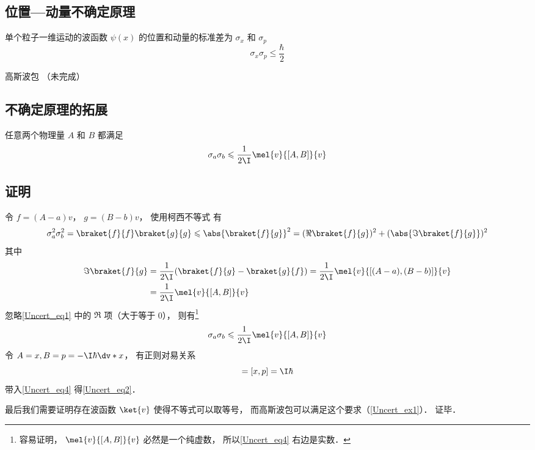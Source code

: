 

\subsection{位置—动量不确定原理}
单个粒子一维运动的波函数 $\psi(x)$ 的位置和动量的标准差为 $\sigma_x$ 和 $\sigma_p$
\begin{equation}\label{Uncert_eq2}
\sigma_x \sigma_p \leqslant \frac{\hbar}{2}
\end{equation}

\begin{example}{高斯波包}\label{Uncert_ex1}
（未完成）
\end{example}

\subsection{不确定原理的拓展}
任意两个物理量 $A$ 和 $B$ 都满足
\begin{equation}
\sigma_a \sigma_b \leqslant \frac{1}{2\I}\mel{v}{[A, B]}{v}
\end{equation}

\subsection{证明}
令 $f = (A-a)v$， $g = (B-b)v$， 使用柯西不等式 有
\begin{equation}\label{Uncert_eq1}
\sigma_a^2 \sigma_b^2 = \braket{f}{f} \braket{g}{g} \leqslant \abs{\braket{f}{g}}^2 = (\Re\braket{f}{g})^2 + (\abs{\Im\braket{f}{g}})^2
\end{equation}
其中
\begin{equation}
\begin{aligned}
\Im\braket{f}{g} &= \frac{1}{2\I}(\braket{f}{g} - \braket{g}{f})
= \frac{1}{2\I}\mel{v}{[(A-a), (B-b)]}{v}\\
&= \frac{1}{2\I}\mel{v}{[A, B]}{v}
\end{aligned}
\end{equation}
忽略\autoref{Uncert_eq1} 中的 $\Re$ 项（大于等于 0）， 则有\footnote{容易证明， $\mel{v}{[A, B]}{v}$ 必然是一个纯虚数， 所以\autoref{Uncert_eq4} 右边是实数．}
\begin{equation}\label{Uncert_eq4}
\sigma_a \sigma_b \leqslant \frac{1}{2\I}\mel{v}{[A, B]}{v}
\end{equation}
令 $A = x, B = p = -\I\hbar \dv*{x}$， 有正则对易关系
\begin{equation}
[A, B] = [x, p] = \I\hbar
\end{equation}
带入\autoref{Uncert_eq4} 得\autoref{Uncert_eq2}． 

最后我们需要证明存在波函数 $\ket{v}$ 使得不等式可以取等号， 而高斯波包可以满足这个要求（\autoref{Uncert_ex1}）．%
证毕．
